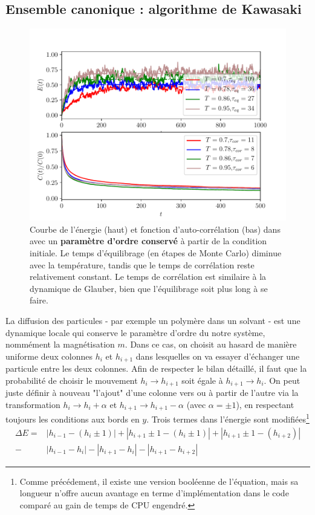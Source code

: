 	\subsection{Ensemble canonique : algorithme de Kawasaki}

\begin{figure}
	\centering
	\includegraphics[scale=1]{numerical/sos-kaw-eq-cor.pdf}
	\caption{Courbe de l'énergie (haut) et fonction d'auto-corrélation (bas) dans avec un \textbf{paramètre d'ordre conservé} à partir de la condition initiale. Le temps d'équilibrage (en étapes de Monte Carlo) diminue avec la température, tandis que le temps de corrélation reste relativement constant. Le temps de corrélation est similaire à la dynamique de Glauber, bien que l'équilibrage soit plus long à se faire.}
	\label{eq-kaw}
\end{figure}
	
La diffusion des particules - par exemple un polymère dans un solvant - est une dynamique locale qui conserve le paramètre d'ordre du notre système, nommément la magnétisation $m$. Dans ce cas, on choisit au hasard de manière uniforme deux colonnes $h_i$ et $h_{i+1}$ dans lesquelles on va essayer d'échanger une particule entre les deux colonnes. Afin de respecter le bilan détaillé, il faut que la probabilité de choisir le mouvement $h_i \rightarrow h_{i+1}$ soit égale à $h_{i+1} \rightarrow h_i$. On peut juste définir à nouveau "l'ajout" d'une colonne vers ou à partir de l'autre via la transformation $h_i \rightarrow h_i + \alpha$ et $h_{i+1} \rightarrow h_{i+1} - \alpha$ (avec $\alpha=\pm 1$), en respectant toujours les conditions aux bords en $y$. Trois termes dans l'énergie sont modifiées\footnote{Comme précédement, il existe une version booléenne de l'équation, mais sa longueur n'offre aucun avantage en terme d'implémentation dans le code comparé au gain de temps de CPU engendré.}
\begin{align}
	\Delta E = &|h_{i-1}-(h_i \pm 1)| + |h_{i+1} \pm 1 -(h_i \pm 1)| + |h_{i+1}\pm 1-(h_{i+2} )| \\
	- &|h_{i-1}-h_i| - |h_{i+1}-h_i| - |h_{i+1}-h_{i+2}|
\end{align}

